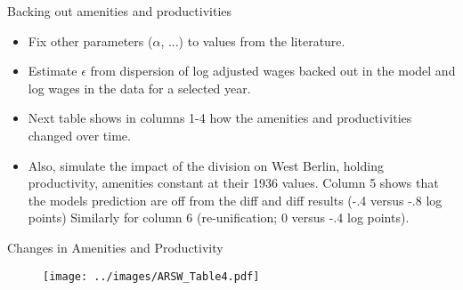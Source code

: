 \documentclass[10pt,notes=hide]{beamer}
\begin{document}
\begin{frame}{Backing out amenities and productivities }
\begin{itemize}
\item Fix other parameters ($\alpha$, ...) to values from the literature. 
\item Estimate $\epsilon$ from dispersion of log adjusted wages backed out in the model and log wages in the data for a selected year. 
\item Next table shows in columns 1-4 how the amenities and productivities changed over time. 
\item Also, simulate the impact of the division on West Berlin, holding productivity, amenities constant at their 1936 values. Column 5 shows that the models prediction are off from the diff and diff results (-.4 versus -.8 log points) Similarly for column 6 (re-unification; 0 versus -.4 log points). 
\end{itemize}
\end{frame}
\begin{frame}{Changes in Amenities and Productivity}
\begin{figure}
\centering
  \texttt{[image: ../images/ARSW\_Table4.pdf]}
\end{figure}
\end{frame}
\end{document}
